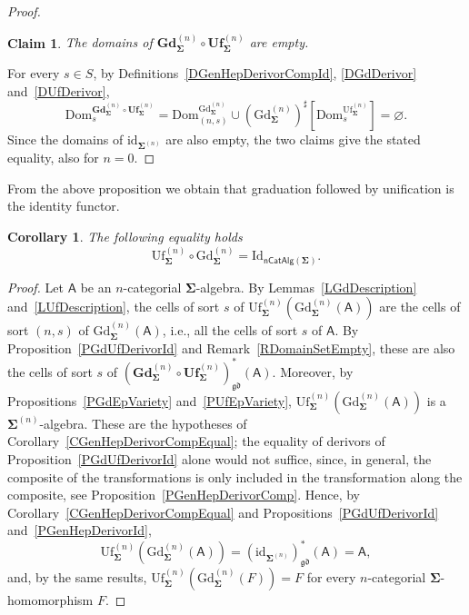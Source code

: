 \documentclass[a4paper, reqno]{amsbook}
\newcommand{\sig}[1]{\mathbf{#1}}             %
\newcommand{\calg}[1]{\boldsymbol{\mathsf{#1}}} %
\newcommand{\Dom}{\mathrm{Dom}}
\newcommand{\gd}{\mathfrak{gd}}              %
\newcommand{\id}{\mathrm{id}}
\newcommand{\Id}{\mathrm{Id}}
\newcommand{\Gd}{\mathrm{Gd}}
\newcommand{\Uf}{\mathrm{Uf}}
\newcommand{\bGd}{\mathbf{Gd}}
\newcommand{\bUf}{\mathbf{Uf}}
\theoremstyle{plain}
\newtheorem{corollary}[theorem]{Corollary}
\newtheorem{claim}[theorem]{Claim}
\theoremstyle{definition}
\begin{document}
\begin{proof}
\begin{claim}\label{ClGdUfDerivorIdB}
The domains of $\bGd^{(n)}_{\sig{\Sigma}}\circ\bUf^{(n)}_{\sig{\Sigma}}$ are empty.
\end{claim}
For every $s\in S$, by Definitions~\ref{DGenHepDerivorCompId}, \ref{DGdDerivor} and~\ref{DUfDerivor},
\[
\Dom^{\bGd^{(n)}_{\sig{\Sigma}}\circ\bUf^{(n)}_{\sig{\Sigma}}}_s
=\Dom^{\Gd^{(n)}_{\sig{\Sigma}}}_{(n,s)}
 \cup(\Gd^{(n)}_{\sig{\Sigma}})^{\sharp}\left[\Dom^{\Uf^{(n)}_{\sig{\Sigma}}}_s\right]
=\varnothing.
\]
Since the domains of $\id_{\sig{\Sigma}^{(n)}}$ are also empty, the two claims give the stated equality, also for $n=0$.
\end{proof}

From the above proposition we obtain that graduation followed by unification is the identity functor.

\begin{corollary}\label{CUfGdId}
The following equality holds
$$
\Uf^{(n)}_{\sig{\Sigma}}\circ\Gd^{(n)}_{\sig{\Sigma}}=\Id_{\mathsf{nCatAlg}(\sig{\Sigma})}.
$$
\end{corollary}
\begin{proof}
Let $\calg{A}$ be an $n$-categorial $\sig{\Sigma}$-algebra.
By Lemmas~\ref{LGdDescription} and~\ref{LUfDescription}, the cells of sort $s$ of $\Uf^{(n)}_{\sig{\Sigma}}(\Gd^{(n)}_{\sig{\Sigma}}(\calg{A}))$ are the cells of sort $(n,s)$ of $\Gd^{(n)}_{\sig{\Sigma}}(\calg{A})$, i.e., all the cells of sort $s$ of $\calg{A}$.
By Proposition~\ref{PGdUfDerivorId} and Remark~\ref{RDomainSetEmpty}, these are also the cells of sort $s$ of $(\bGd^{(n)}_{\sig{\Sigma}}\circ\bUf^{(n)}_{\sig{\Sigma}})^{\ast}_{\gd}(\calg{A})$.
Moreover, by Propositions~\ref{PGdEpVariety} and~\ref{PUfEpVariety}, $\Uf^{(n)}_{\sig{\Sigma}}(\Gd^{(n)}_{\sig{\Sigma}}(\calg{A}))$ is a $\sig{\Sigma}^{(n)}$-algebra.
These are the hypotheses of Corollary~\ref{CGenHepDerivorCompEqual}; the equality of derivors of Proposition~\ref{PGdUfDerivorId} alone would not suffice, since, in general, the composite of the transformations is only included in the transformation along the composite, see Proposition~\ref{PGenHepDerivorComp}.
Hence, by Corollary~\ref{CGenHepDerivorCompEqual} and Propositions~\ref{PGdUfDerivorId} and~\ref{PGenHepDerivorId},
$$
\Uf^{(n)}_{\sig{\Sigma}}\left(\Gd^{(n)}_{\sig{\Sigma}}(\calg{A})\right)
=\left(\id_{\sig{\Sigma}^{(n)}}\right)^{\ast}_{\gd}(\calg{A})
=\calg{A},
$$
and, by the same results, $\Uf^{(n)}_{\sig{\Sigma}}(\Gd^{(n)}_{\sig{\Sigma}}(F))=F$ for every $n$-categorial $\sig{\Sigma}$-homomorphism $F$.
\end{proof}
\end{document}
